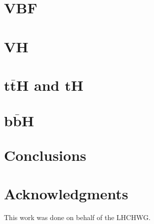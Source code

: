 \documentclass[11pt]{report}
\begin{document}
\section*{VBF}


\section*{VH}


\section*{$\boldsymbol{t\bar{t}H}$ and $\boldsymbol{tH}$}


\section*{$\boldsymbol{b\bar{b}H}$}


\section*{Conclusions}


\section*{Acknowledgments}
This work was done on behalf of the LHCHWG.
\newpage


\end{document}
